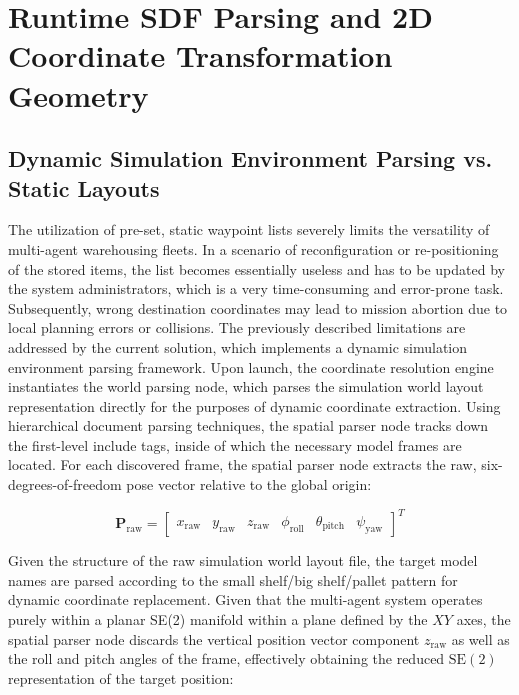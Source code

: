 \section{Runtime SDF Parsing and 2D Coordinate Transformation Geometry}

\subsection{Dynamic Simulation Environment Parsing vs. Static Layouts}

The utilization of pre-set, static waypoint lists severely limits the versatility of multi-agent warehousing fleets. In a scenario of reconfiguration or re-positioning of the stored items, the list becomes essentially useless and has to be updated by the system administrators, which is a very time-consuming and error-prone task. Subsequently, wrong destination coordinates may lead to mission abortion due to local planning errors or collisions. The previously described limitations are addressed by the current solution, which implements a dynamic simulation environment parsing framework. Upon launch, the coordinate resolution engine instantiates the world parsing node, which parses the simulation world layout representation directly for the purposes of dynamic coordinate extraction\cite{mattila2022using}. Using hierarchical document parsing techniques, the spatial parser node tracks down the first-level include tags, inside of which the necessary model frames are located. For each discovered frame, the spatial parser node extracts the raw, six-degrees-of-freedom pose vector relative to the global origin:

\begin{equation}
\mathbf{P}_{\text{raw}} = \begin{bmatrix} x_{\text{raw}} & y_{\text{raw}} & z_{\text{raw}} & \phi_{\text{roll}} & \theta_{\text{pitch}} & \psi_{\text{yaw}} \end{bmatrix}^T
\label{eq:raw_pose_vector}
\end{equation}

Given the structure of the raw simulation world layout file, the target model names are parsed according to the small shelf/big shelf/pallet pattern for dynamic coordinate replacement. Given that the multi-agent system operates purely within a planar SE(2) manifold within a plane defined by the $XY$ axes, the spatial parser node discards the vertical position vector component $z_{\text{raw}}$ as well as the roll and pitch angles of the frame, effectively obtaining the reduced $\text{SE}(2)$ representation of the target position:

